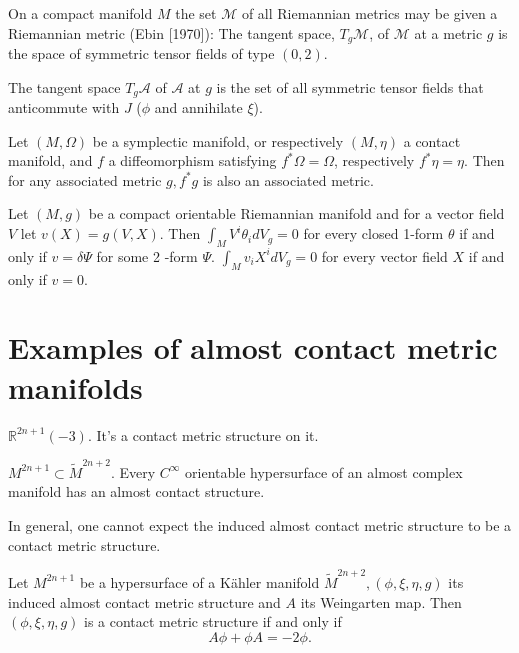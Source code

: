 \begin{proposition}
    On a compact manifold $M$ the set $\mathcal{M}$ of all Riemannian metrics may be given a Riemannian metric (Ebin [1970]): The tangent space, $T_g \mathcal{M}$, of $\mathcal{M}$ at a metric $g$ is the space of symmetric tensor fields of type $(0,2)$.

    The tangent space $T_g\mathcal{A}$ of $\mathcal{A}$ at $g$ is the set of all symmetric tensor fields that anticommute with $J$ ($\phi$ and annihilate $\xi$).
\end{proposition}

\begin{theorem}
    Let $(M, \Omega)$ be a symplectic manifold, or respectively $(M, \eta)$ a contact manifold, and $f$ a diffeomorphism satisfying $f^* \Omega=\Omega$, respectively $f^* \eta=\eta$. Then for any associated metric $g, f^* g$ is also an associated metric.
\end{theorem}

\begin{lemma}
    Let $(M, g)$ be a compact orientable Riemannian manifold and for a vector field $V$ let $v(X)=g(V, X)$. Then $\int_M V^i \theta_i d V_g=0$ for every closed 1-form $\theta$ if and only if $v=\delta \Psi$ for some 2 -form $\Psi$. $\int_M v_i X^i d V_g=0$ for every vector field $X$ if and only if $v=0$.
\end{lemma}

\section{Examples of almost contact metric manifolds}

\begin{example}
    $\mathbb{R}^{2n+1}(-3).$ It's a contact metric structure on it.
\end{example}

\begin{example}
    $M^{2n+1}\subset \tilde{M}^{2n+2}$. Every $C^{\infty}$ orientable hypersurface of an almost complex manifold has an almost contact structure.

    In general, one cannot expect the induced almost contact metric structure to be a contact metric structure.
\end{example}
\begin{theorem}
    Let $M^{2 n+1}$ be a hypersurface of a Kähler manifold $\tilde{M}^{2 n+2},(\phi, \xi, \eta, g)$ its induced almost contact metric structure and $A$ its Weingarten map. Then $(\phi, \xi, \eta, g)$ is a contact metric structure if and only if 
    \begin{equation}
        A \phi+\phi A=-2 \phi.
    \end{equation}
\end{theorem}

